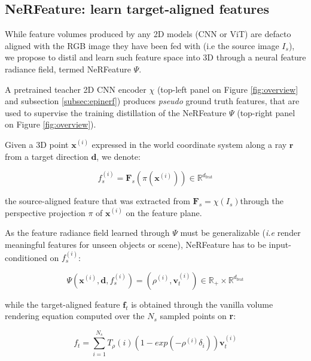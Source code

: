 \subsection{NeRFeature: learn target-aligned features}
\label{subsec:epinerf/method/nerfeature}

While feature volumes produced by any 2D models (CNN or ViT) are defacto aligned with the RGB image they have been fed with (i.e the source image $I_s$), we propose to distil and learn such feature space into 3D through a neural feature radiance field, termed NeRFeature $\Psi$. 

A pretrained teacher 2D CNN encoder $\chi$ (top-left panel on Figure \ref{fig:overview} and subsection \ref{subsec:epinerf}) produces \textit{pseudo} ground truth features, that are used to supervise the training distillation of the NeRFeature $\Psi$ (top-right panel on Figure \ref{fig:overview}).

Given a 3D point $\mathbf{x}^{(i)}$ expressed in the world coordinate system along a ray $\mathbf{r}$ from a target direction $\mathbf{d}$, we denote: 

\begin{equation}
    f_{s}^{(i)} = \mathbf{F}_{s}(\pi(\mathbf{x}^{(i)}))  \in \mathbb{R}^{d_{\text{feat}}} 
    \label{eq:projection}
\end{equation}

the source-aligned feature that was extracted from $\mathbf{F}_{s}=\chi(I_{s})$through the perspective projection $\pi$ of $\mathbf{x}^{(i)}$ on the feature plane.

As the feature radiance field learned through $\Psi$ must be generalizable (\textit{i.e} render meaningful features for unseen objects or scene), NeRFeature has to be input-conditioned on $f_{s}^{(i)}$: 

\begin{equation}
    \Psi(\mathbf{x}^{(i)},\mathbf{d},f_{s}^{(i)}) = (\rho^{(i)},\mathbf{v}_{t}^{(i)}) \in \mathbb{R}_{+}\times \mathbb{R}^{d_{\text{feat}}}
\end{equation}

while the target-aligned feature $\mathbf{f}_{t}$ is obtained through the vanilla volume rendering equation computed over the $N_s$ sampled points on \textbf{r}: 

\begin{equation}
    f_{t} = \sum_{i=1}^{N_{s}} T_{\rho}(i)(1-exp(-\rho^{(i)}\delta_{i}))\mathbf{v}_{t}^{(i)}
\end{equation}

